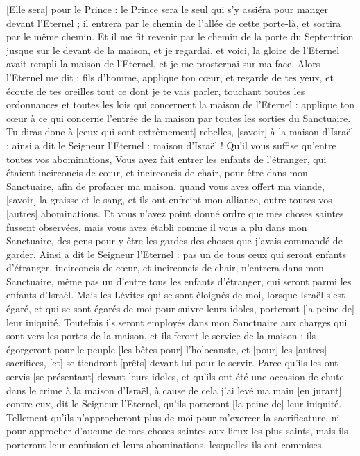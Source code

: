 \begin{multicols}{2}
[Elle sera] pour le Prince : le Prince sera le seul qui s'y assiéra pour manger devant l'Eternel ; il entrera par le chemin de l'allée de cette porte-là, et sortira par le même chemin.
Et il me fit revenir par le chemin de la porte du Septentrion jusque sur le devant de la maison, et je regardai, et voici, la gloire de l'Eternel avait rempli la maison de l'Eternel, et je me prosternai sur ma face.
Alors l'Eternel me dit : fils d'homme, applique ton cœur, et regarde de tes yeux, et écoute de tes oreilles tout ce dont je te vais parler, touchant toutes les ordonnances et toutes les lois qui concernent la maison de l'Eternel : applique ton cœur à ce qui concerne l'entrée de la maison par toutes les sorties du Sanctuaire.
Tu diras donc à [ceux qui sont extrêmement] rebelles, [savoir] à la maison d'Israël : ainsi a dit le Seigneur l'Eternel : maison d'Israël ! Qu'il vous suffise qu'entre toutes vos abominations,
Vous ayez fait entrer les enfants de l'étranger, qui étaient incirconcis de cœur, et incirconcis de chair, pour être dans mon Sanctuaire, afin de profaner ma maison, quand vous avez offert ma viande, [savoir] la graisse et le sang, et ils ont enfreint mon alliance, outre toutes vos [autres] abominations.
Et vous n'avez point donné ordre que mes choses saintes fussent observées, mais vous avez établi comme il vous a plu dans mon Sanctuaire, des gens pour y être les gardes des choses que j'avais commandé de garder.
Ainsi a dit le Seigneur l'Eternel : pas un de tous ceux qui seront enfants d'étranger, incirconcis de cœur, et incirconcis de chair, n'entrera dans mon Sanctuaire, même pas un d'entre tous les enfants d'étranger, qui seront parmi les enfants d'Israël.
Mais les Lévites qui se sont éloignés de moi, lorsque Israël s'est égaré, et qui se sont égarés de moi pour suivre leurs idoles, porteront [la peine de] leur iniquité.
Toutefois ils seront employés dans mon Sanctuaire aux charges qui sont vers les portes de la maison, et ils feront le service de la maison ; ils égorgeront pour le peuple [les bêtes pour] l'holocauste, et [pour] les [autres] sacrifices, [et] se tiendront [prêts] devant lui pour le servir.
Parce qu'ils les ont servis [se présentant] devant leurs idoles, et qu'ils ont été une occasion de chute dans le crime à la maison d'Israël, à cause de cela j'ai levé ma main [en jurant] contre eux, dit le Seigneur l'Eternel, qu'ils porteront [la peine de] leur iniquité.
Tellement qu'ils n'approcheront plus de moi pour m'exercer la sacrificature, ni pour approcher d'aucune de mes choses saintes aux lieux les plus saints, mais ils porteront leur confusion et leurs abominations, lesquelles ils ont commises.

\end{multicols}
